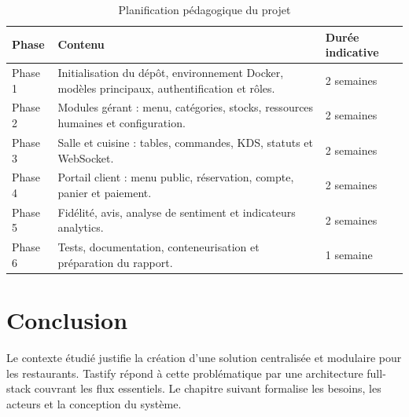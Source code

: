 \begin{table}[H]
\centering
\caption{Planification pédagogique du projet}
\label{tab:planification}
\begin{tabularx}{\textwidth}{p{2.2cm}Yp{2.4cm}}
\toprule
\textbf{Phase} & \textbf{Contenu} & \textbf{Durée indicative} \\
\midrule
Phase 1 & Initialisation du dépôt, environnement Docker, modèles principaux, authentification et rôles. & 2 semaines \\
Phase 2 & Modules gérant : menu, catégories, stocks, ressources humaines et configuration. & 2 semaines \\
Phase 3 & Salle et cuisine : tables, commandes, KDS, statuts et WebSocket. & 2 semaines \\
Phase 4 & Portail client : menu public, réservation, compte, panier et paiement. & 2 semaines \\
Phase 5 & Fidélité, avis, analyse de sentiment et indicateurs analytics. & 2 semaines \\
Phase 6 & Tests, documentation, conteneurisation et préparation du rapport. & 1 semaine \\
\bottomrule
\end{tabularx}
\end{table}

\section*{Conclusion}
Le contexte étudié justifie la création d'une solution centralisée et modulaire pour les restaurants. Tastify répond à cette problématique par une architecture full-stack couvrant les flux essentiels. Le chapitre suivant formalise les besoins, les acteurs et la conception du système.
